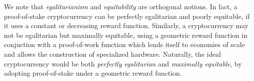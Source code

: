 We note that \emph{egalitarianism} and \emph{equitability} are orthogonal
notions. In fact, a proof-of-stake cryptocurrency can be perfectly egalitarian
and poorly equitable, \eg if it uses a constant or decreasing reward function.
Similarly, a cryptocurrency may not be egalitarian but maximally equitable, \eg
using a geometric reward function in conjuction with a proof-of-work function
which lends itself to economies of scale and allows the construction of
specialized hardware.
Naturally, the ideal cryptocurrency would be both
\emph{perfectly egalitarian} and \emph{maximally equitable}, \eg by adopting
proof-of-stake under a geometric reward function.

